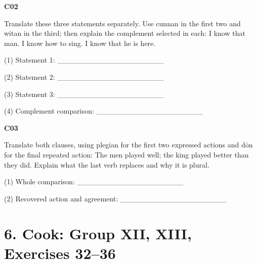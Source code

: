 \par\begin{minipage}{\linewidth}\raggedright
\textbf{C02}

Translate these three statements separately. Use cunnan in the first two and witan in the third; then explain the complement selected in each: I know that man. I know how to sing. I know that he is here.

(1) Statement 1: \_\_\_\_\_\_\_\_\_\_\_\_\_\_\_\_\_\_\_\_

(2) Statement 2: \_\_\_\_\_\_\_\_\_\_\_\_\_\_\_\_\_\_\_\_

(3) Statement 3: \_\_\_\_\_\_\_\_\_\_\_\_\_\_\_\_\_\_\_\_

(4) Complement comparison: \_\_\_\_\_\_\_\_\_\_\_\_\_\_\_\_\_\_\_\_

\end{minipage}\par\addvspace{4pt}

\par\begin{minipage}{\linewidth}\raggedright
\textbf{C03}

Translate both clauses, using plegian for the first two expressed actions and dōn for the final repeated action: The men played well; the king played better than they did. Explain what the last verb replaces and why it is plural.

(1) Whole comparison: \_\_\_\_\_\_\_\_\_\_\_\_\_\_\_\_\_\_\_\_

(2) Recovered action and agreement: \_\_\_\_\_\_\_\_\_\_\_\_\_\_\_\_\_\_\_\_

\end{minipage}\par\addvspace{4pt}

\section*{6. Cook: Group XII, XIII, Exercises 32–36}

